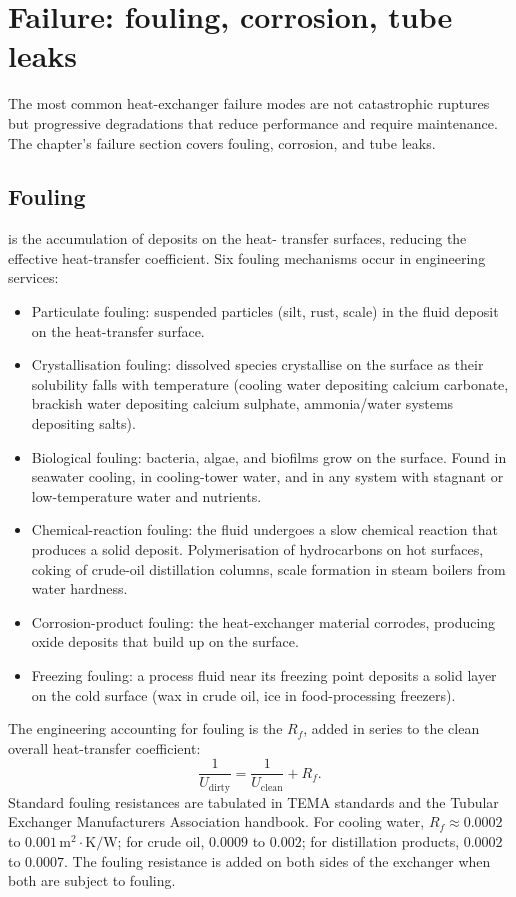 \section{Failure: fouling, corrosion, tube leaks}

The most common heat-exchanger failure modes are not catastrophic
ruptures but progressive degradations that reduce performance and
require maintenance. The chapter's failure section covers fouling,
corrosion, and tube leaks.

\subsection{Fouling}

 is the accumulation of deposits on the heat-
transfer surfaces, reducing the effective heat-transfer coefficient.
Six fouling mechanisms occur in engineering services:

\begin{itemize}[leftmargin=*]
  \item Particulate fouling: suspended particles (silt, rust, scale)
    in the fluid deposit on the heat-transfer surface.
  \item Crystallisation fouling: dissolved species crystallise on the
    surface as their solubility falls with temperature (cooling
    water depositing calcium carbonate, brackish water depositing
    calcium sulphate, ammonia/water systems depositing salts).
  \item Biological fouling: bacteria, algae, and biofilms grow on
    the surface. Found in seawater cooling, in cooling-tower water,
    and in any system with stagnant or low-temperature water and
    nutrients.
  \item Chemical-reaction fouling: the fluid undergoes a slow
    chemical reaction that produces a solid deposit. Polymerisation
    of hydrocarbons on hot surfaces, coking of crude-oil
    distillation columns, scale formation in steam boilers from
    water hardness.
  \item Corrosion-product fouling: the heat-exchanger material
    corrodes, producing oxide deposits that build up on the surface.
  \item Freezing fouling: a process fluid near its freezing point
    deposits a solid layer on the cold surface (wax in crude oil,
    ice in food-processing freezers).
\end{itemize}

The engineering accounting for fouling is the  $R_f$, added in series to the clean overall heat-transfer
coefficient:
\[
\frac{1}{U_{\text{dirty}}} = \frac{1}{U_{\text{clean}}} + R_f.
\]
Standard fouling resistances are tabulated in TEMA standards and
the Tubular Exchanger Manufacturers Association handbook. For
cooling water, $R_f \approx 0.0002$ to $0.001\,\text{m}^2\cdot\si{
\kelvin}/\text{W}$; for crude oil, $0.0009$ to $0.002$; for distillation
products, $0.0002$ to $0.0007$. The fouling resistance is added on
both sides of the exchanger when both are subject to fouling.


